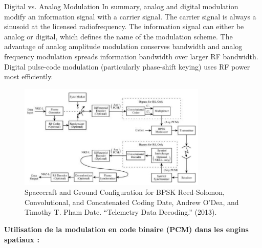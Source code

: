 Digital vs. Analog Modulation
In summary, analog and digital modulation modify an information signal with a carrier signal. The carrier signal is always a sinusoid at the licensed radiofrequency. The information signal can either be analog or digital, which defines the name of the modulation scheme.
The advantage of analog amplitude modulation conserves bandwidth and analog frequency modulation spreads information bandwidth over larger RF bandwidth. Digital pulse-code modulation (particularly phase-shift keying) uses RF power most efficiently.
\begin{figure}[H] %
    \centering
    \includegraphics[width=0.8\textwidth]{figures/6-45.jpg}
    \caption{Spacecraft and Ground Configuration for BPSK Reed-Solomon, Convolutional, and Concatenated Coding Date, Andrew O’Dea, and Timothy T. Pham Date. “Telemetry Data Decoding.” (2013).}
    \label{fig:communication2}
\end{figure}
\textbf{Utilisation de la modulation en code binaire (PCM) dans les engins spatiaux :}
